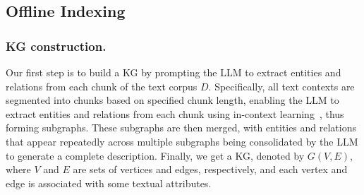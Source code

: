 \subsection{Offline Indexing}



\subsubsection{KG construction.}
Our first step is to build a KG by prompting the LLM to extract entities and relations from each chunk of the text corpus $D$.
% 
Specifically, all text contexts are segmented into chunks based on specified chunk length, enabling the LLM to extract entities and relations from each chunk using in-context learning~\cite{brown2020language}, thus forming subgraphs.
% 
These subgraphs are then merged, with entities and relations that appear repeatedly across multiple subgraphs being consolidated by the LLM to generate a complete description.
%
Finally, we get a KG, denoted by $G(V,E)$, where $V$ and $E$ are sets of vertices and edges, respectively, and each vertex and edge is associated with some textual attributes.





